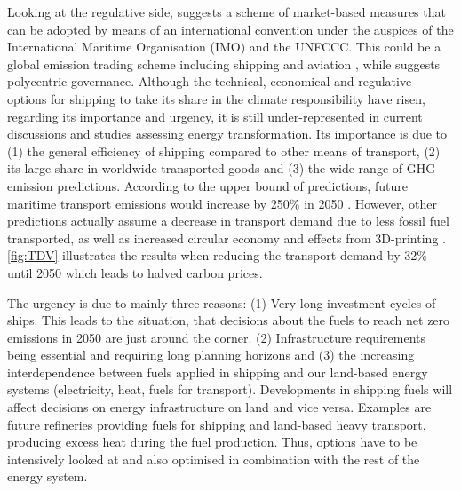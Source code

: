 \documentclass[article]{elsarticle}
\begin{document}
Looking at the regulative side, \citet{SHI2016} suggests a scheme of market-based measures that can be adopted by means of an international convention under the auspices of the International Maritime Organisation (IMO) and the UNFCCC. This could be a global emission trading scheme including shipping and aviation \cite{Dessens2014}, while \citet{GRITSENKO2017} suggests polycentric governance.
%
Although the technical, economical and regulative options for shipping to take its share in the climate responsibility have risen, regarding its importance and urgency, it is still under-represented in current discussions and studies assessing energy transformation. Its importance is due to (1) the general efficiency of shipping compared to other means of transport, (2) its large share in worldwide transported goods and (3) the wide range of GHG emission  predictions. According to the upper bound of predictions, future maritime transport emissions would increase by 250\% in 2050 \cite{EuropeanCommission2018}. However, other predictions actually assume a decrease in transport demand due to less fossil fuel transported, as well as increased circular economy and effects from 3D-printing \cite{ITF2018}. \autoref{fig:TDV} illustrates the results when reducing the transport demand by 32\% until 2050 which leads to halved carbon prices. %

The urgency is due to mainly three reasons: (1) Very long investment cycles of ships. This leads to the situation, that decisions about the fuels to reach net zero emissions in 2050 are just around the corner. (2) Infrastructure requirements being essential and requiring long planning horizons and (3) the increasing interdependence between fuels applied in shipping and our land-based energy systems (electricity, heat, fuels for transport). Developments in shipping fuels will affect decisions on energy infrastructure on land and vice versa. Examples are future refineries providing fuels for shipping and land-based heavy transport, producing excess heat during the fuel production. Thus, options have to be intensively looked at and also optimised in combination with the rest of the energy system. 
\end{document}
